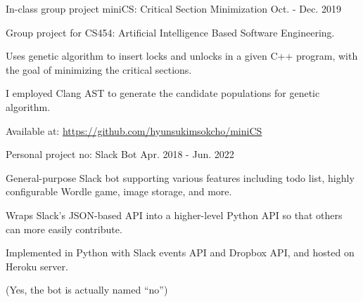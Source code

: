 

\begin{cventries}

  \cventry
    {In-class group project} %
    {miniCS: Critical Section Minimization} %
    {} %
    {Oct. - Dec. 2019} %
    {
      \begin{cvitems} %
        \item {Group project for CS454: Artificial Intelligence Based Software Engineering.}
        \item {Uses genetic algorithm to insert locks and unlocks in a given C++ program, with the goal of minimizing the critical sections.}
        \item {I employed Clang AST to generate the candidate populations for genetic algorithm.}
        \item {Available at: \href{https://github.com/hyunsukimsokcho/miniCS}{https://github.com/hyunsukimsokcho/miniCS}}
      \end{cvitems}
    }

  \cventry
    {Personal project} %
    {no: Slack Bot} %
    {} %
    {Apr. 2018 - Jun. 2022} %
    {
      \begin{cvitems} %
        \item {General-purpose Slack bot supporting various features including todo list, highly configurable Wordle game, image storage, and more.}
        \item {Wraps Slack's JSON-based API into a higher-level Python API so that others can more easily contribute.}
        \item {Implemented in Python with Slack events API and Dropbox API, and hosted on Heroku server.}
        \item {(Yes, the bot is actually named ``no'')}
      \end{cvitems}
    }

\end{cventries}

